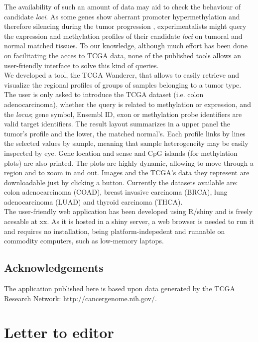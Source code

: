 \documentclass{article}
\begin{document}
The availability of such an amount of data may aid to check the behaviour of candidate \textit{loci}. As some genes show aberrant promoter hypermethylation and therefore silencing during the tumor progression \cite{jones2002fundamental}, experimentalists might query the expression and methylation profiles of their candidate \textit{loci} on tumoral and normal matched tissues. To our knowledge, although much effort has been done on facilitating the acces to TCGA data, none of the published tools allows an user-friendly interface to solve this kind of queries.\\

%
We developed a tool, the TCGA Wanderer, that allows to easily retrieve and visualize the regional profiles of groups of samples belonging to a tumor type. The user is only asked to introduce the TCGA dataset (i.e. colon adenocarcinoma), whether the query is related to methylation or expression, and the \textit{locus}; gene symbol, Ensembl ID, exon or methylation probe identifiers are valid target identifiers. The result layout summarizes in a upper panel the tumor's profile and the lower, the matched normal's. Each profile links by lines the selected values by sample, meaning that sample heterogeneity may be easily inspected by eye. Gene location and sense and CpG islands (for methylation plots) are also printed. The plots are highly dynamic, allowing to move through a region and to zoom in and out. Images and the TCGA's data they represent are downloadable just by clicking a button. Currently the datasets available are: colon adenocarcinoma (COAD), breast invasive carcinoma (BRCA), lung adenocarcinoma (LUAD) and thyroid carcinoma (THCA).  \\


The user-friendly web application has been developed using R/shiny and is freely acesable at xx. As it is hosted in a shiny server, a web browser is needed to run it and requires no installation, being platform-indepedent and runnable on commodity computers, such as low-memory laptops.\\

\subsection{Acknowledgements}
The application published here is based upon data generated by the TCGA Research Network: http://cancergenome.nih.gov/.








\section{Letter to editor}
\end{document}
